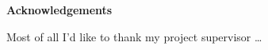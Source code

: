 \begin{center}
    {\LARGE\bf Acknowledgements}
\end{center}

Most of all I'd like to thank my project supervisor \dots


